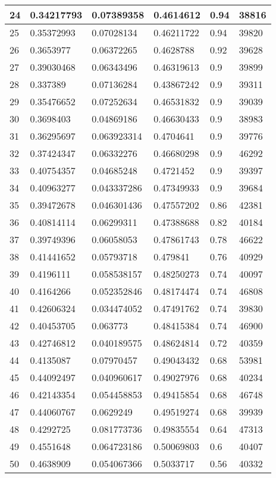 \begin{longtable}{|l|l|l|l|l|l|}
24 & 0.34217793 & 0.07389358 & 0.4614612 & 0.94 & 38816 \\ \hline 
25 & 0.35372993 & 0.07028134 & 0.46211722 & 0.94 & 39820 \\ \hline 
26 & 0.3653977 & 0.06372265 & 0.4628788 & 0.92 & 39628 \\ \hline 
27 & 0.39030468 & 0.06343496 & 0.46319613 & 0.9 & 39899 \\ \hline 
28 & 0.337389 & 0.07136284 & 0.43867242 & 0.9 & 39311 \\ \hline 
29 & 0.35476652 & 0.07252634 & 0.46531832 & 0.9 & 39039 \\ \hline 
30 & 0.3698403 & 0.04869186 & 0.46630433 & 0.9 & 38983 \\ \hline 
31 & 0.36295697 & 0.063923314 & 0.4704641 & 0.9 & 39776 \\ \hline 
32 & 0.37424347 & 0.06332276 & 0.46680298 & 0.9 & 46292 \\ \hline 
33 & 0.40754357 & 0.04685248 & 0.4721452 & 0.9 & 39397 \\ \hline 
34 & 0.40963277 & 0.043337286 & 0.47349933 & 0.9 & 39684 \\ \hline 
35 & 0.39472678 & 0.046301436 & 0.47557202 & 0.86 & 42381 \\ \hline 
36 & 0.40814114 & 0.06299311 & 0.47388688 & 0.82 & 40184 \\ \hline 
37 & 0.39749396 & 0.06058053 & 0.47861743 & 0.78 & 46622 \\ \hline 
38 & 0.41441652 & 0.05793718 & 0.479841 & 0.76 & 40929 \\ \hline 
39 & 0.4196111 & 0.058538157 & 0.48250273 & 0.74 & 40097 \\ \hline 
40 & 0.4164266 & 0.052352846 & 0.48174474 & 0.74 & 46808 \\ \hline 
41 & 0.42606324 & 0.034474052 & 0.47491762 & 0.74 & 39830 \\ \hline 
42 & 0.40453705 & 0.063773 & 0.48415384 & 0.74 & 46900 \\ \hline 
43 & 0.42746812 & 0.040189575 & 0.48624814 & 0.72 & 40359 \\ \hline 
44 & 0.4135087 & 0.07970457 & 0.49043432 & 0.68 & 53981 \\ \hline 
45 & 0.44092497 & 0.040960617 & 0.49027976 & 0.68 & 40234 \\ \hline 
46 & 0.42143354 & 0.054458853 & 0.49415854 & 0.68 & 46748 \\ \hline 
47 & 0.44060767 & 0.0629249 & 0.49519274 & 0.68 & 39939 \\ \hline 
48 & 0.4292725 & 0.081773736 & 0.49835554 & 0.64 & 47313 \\ \hline 
49 & 0.4551648 & 0.064723186 & 0.50069803 & 0.6 & 40407 \\ \hline 
50 & 0.4638909 & 0.054067366 & 0.5033717 & 0.56 & 40332 \\ \hline 
\end{longtable}